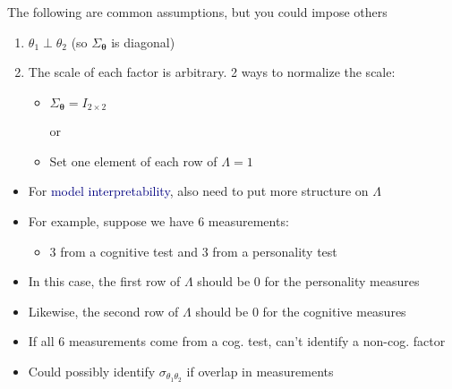 \documentclass[aspectratio=169]{beamer}
\begin{document}
\begin{frame}

The following are common assumptions, but you could impose others

\bigskip{}

\begin{enumerate}
\itemsep1.5em
\item<2-> $\theta_1 \perp \theta_2$ (so $\Sigma_{\boldsymbol{\theta}}$ is diagonal)
\item<3-> The scale of each factor is arbitrary. 2 ways to normalize the scale:
    \bigskip\par
    \begin{itemize}
    \itemsep1.5em
    \item<4-> $\Sigma_{\boldsymbol{\theta}} = I_{2\times 2}$
    \medskip\par or \vspace{-0.25cm}
    \item<5-> Set one element of each row of $\Lambda=1$
    \end{itemize}
\end{enumerate}
\bigskip\par
{}

\end{frame}

\begin{frame}

\begin{itemize}
\itemsep1.5em
\item<1-> For \textcolor{navy}{model interpretability}, also need to put more structure on $\Lambda$
\item<2-> For example, suppose we have 6 measurements: 
\bigskip\par
    \begin{itemize}
    \itemsep1.5em
    \item<3-> 3 from a cognitive test and 3 from a personality test
    \end{itemize}
\item<4-> In this case, the first row of $\Lambda$ should be 0 for the personality measures
\item<5-> Likewise, the second row of $\Lambda$ should be 0 for the cognitive measures
\item<6-> If all 6 measurements come from a cog. test, can't identify a non-cog. factor
\item<7-> Could possibly identify $\sigma_{\theta_1\theta_2}$ if overlap in measurements
\end{itemize}

\end{frame}
\end{document}
